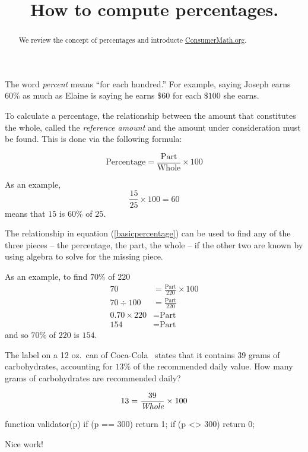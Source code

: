 \documentclass{ximera}
\title{How to compute percentages.}
\begin{document}
\begin{abstract}
We review the concept of percentages and introducte \protect\url{ConsumerMath.org}.
\end{abstract}
\maketitle


The word \emph{percent} means ``for each hundred.'' For example, saying Joseph earns $60\%$ as much as Elaine is saying he earns $\$60$ for each $\$100$ she earns.

To calculate a percentage, the relationship between the amount that constitutes the whole, called the \emph{reference amount} and the amount under consideration must be found. This is done via the following formula:

\begin{equation}\label{basicpercentage}
\text{Percentage}=\frac{\text{Part}}{\text{Whole}}\times 100
\end{equation}

As an example,
\begin{equation*}
\frac{15}{25}\times 100=60
\end{equation*}
means that $15$ is $60\%$ of $25$.

The relationship in equation (\ref{basicpercentage}) can be used to find any of the three pieces -- the percentage, the part, the whole -- if the other two are known by using algebra to solve for the missing piece.

As an example, to find $70\%$ of $220$
\begin{align*}
70&=\frac{\text{Part}}{220}\times 100\\
70\div 100 &=\frac{\text{Part}}{220}\\
0.70\times 220 &=\text{Part}\\
154&=\text{Part}
\end{align*}
and so $70\%$ of $220$ is $154$.

\newcommand\customfont[1]{{ #1 }}

\begin{question}
The label on a 12 oz.\ can of \customfont{Coca-Cola}\ states that it contains 39 grams of carbohydrates, accounting for $13\%$ of the recommended daily value. How many grams of carbohydrates are recommended daily?

\begin{solution}
\begin{hint}
\begin{equation*}13=\frac{39}{\emph{\text{Whole}}}\times 100\end{equation*}
\end{hint}
\begin{expression-answer}
function validator(p) {
    if (p == 300)
      return 1;
    if (p <> 300)
      return 0;
  }
\end{expression-answer}
\end{solution}

Nice work!
\end{question}
\end{document}
